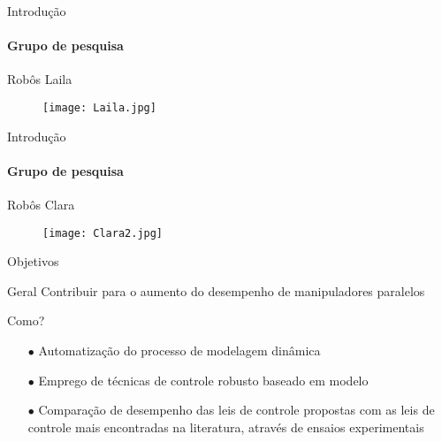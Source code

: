 \documentclass[25pt,landscape]{beamer}
\begin{document}
\begin{frame}{Introdução}
	\framesubtitle{Grupo de pesquisa}
	\begin{block}{Rob\^os}
		Laila
    \end{block}
    \begin{figure}[!h]
        \centering
        \texttt{[image: Laila.jpg]}
    \end{figure}
\end{frame}

\begin{frame}{Introdução}
	\framesubtitle{Grupo de pesquisa}
	\begin{block}{Rob\^os}
		Clara
    \end{block}
    \begin{figure}[!h]
        \centering
        \texttt{[image: Clara2.jpg]}
    \end{figure}
\end{frame}

\begin{frame}{Objetivos}
	\pause
	\begin{block}{Geral}
		Contribuir para o aumento do desempenho de manipuladores paralelos
	\end{block}
	\pause
	\begin{exampleblock}{Como?}
		\pause
		\begin{itemize}
			\item[$\bullet$] Automatização do processo de modelagem dinâmica \\[8pt]
			\pause
			\item[$\bullet$] Emprego de técnicas de controle robusto baseado em modelo \\[8pt]
			\pause
			\item[$\bullet$] Compara\c{c}\~ao de desempenho das leis de controle propostas com as leis de controle mais encontradas na literatura, atrav\'es de ensaios experimentais \\[8pt]
		\end{itemize}
	\end{exampleblock}
\end{frame}

\end{document}
